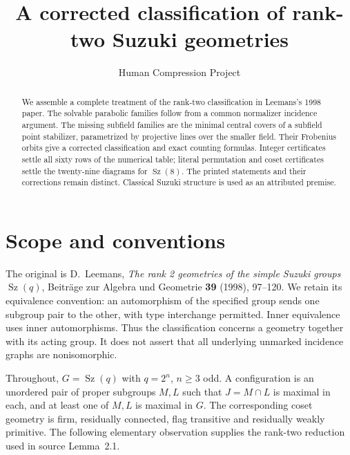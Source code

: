 \documentclass[11pt]{article}
\title{A corrected classification of rank-two Suzuki geometries}
\author{Human Compression Project}
\date{}
\newcommand{\Sz}{\operatorname{Sz}}
\begin{document}
\maketitle
\begin{abstract}
We assemble a complete treatment of the rank-two classification in
Leemans's 1998 paper. The solvable parabolic families follow from a common
normalizer incidence argument. The missing subfield families are the
minimal central covers of a subfield point stabilizer, parametrized by
projective lines over the smaller field. Their Frobenius orbits give a
corrected classification and exact counting formulas. Integer certificates
settle all sixty rows of the numerical table; literal permutation and
coset certificates settle the twenty-nine diagrams for $\Sz(8)$.
The printed statements and their corrections remain distinct. Classical
Suzuki structure is used as an attributed premise.
\end{abstract}

\section{Scope and conventions}
The original is D.~Leemans, \emph{The rank 2 geometries of the simple
Suzuki groups $\Sz(q)$}, Beitr\"age zur Algebra und Geometrie \textbf{39}
(1998), 97--120. We retain its equivalence convention: an automorphism
of the specified group sends one subgroup pair to the other, with type
interchange permitted. Inner equivalence uses inner automorphisms.
Thus the classification concerns a geometry together with its acting
group. It does not assert that all underlying unmarked incidence graphs
are nonisomorphic.

Throughout, $G=\Sz(q)$ with $q=2^n$, $n\ge3$ odd. A configuration is an
unordered pair of proper subgroups $M,L$ such that $J=M\cap L$ is maximal
in each, and at least one of $M,L$ is maximal in $G$. The corresponding
coset geometry is firm, residually connected, flag transitive and
residually weakly primitive. The following elementary observation supplies
the rank-two reduction used in source Lemma~2.1.
\end{document}
